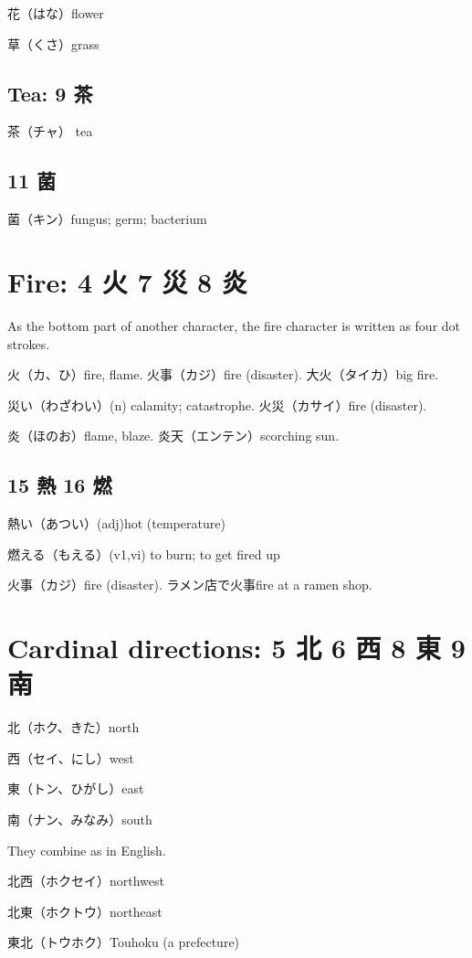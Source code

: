 花（はな）flower

草（くさ）grass

\subsection{Tea: 9 茶}

茶（チャ） tea

\subsection{11 菌}

菌（キン）fungus; germ; bacterium

\section{Fire: 4 火 7 災 8 炎}

As the bottom part of another character,
the fire character is written as four dot strokes.

火（カ、ひ）fire, flame.
火事（カジ）fire (disaster).
大火（タイカ）big fire.

災い（わざわい）(n) calamity; catastrophe.
火災（カサイ）fire (disaster).

炎（ほのお）flame, blaze.
炎天（エンテン）scorching sun.

\subsection{15 熱 16 燃}

熱い（あつい）(adj)hot (temperature)

燃える（もえる）(v1,vi) to burn; to get fired up

火事（カジ）fire (disaster).
ラメン店で火事fire at a ramen shop.

\section{Cardinal directions: 5 北 6 西 8 東 9 南}

北（ホク、きた）north

西（セイ、にし）west

東（トン、ひがし）east

南（ナン、みなみ）south

They combine as in English.

北西（ホクセイ）northwest

北東（ホクトウ）northeast

東北（トウホク）Touhoku (a prefecture)


